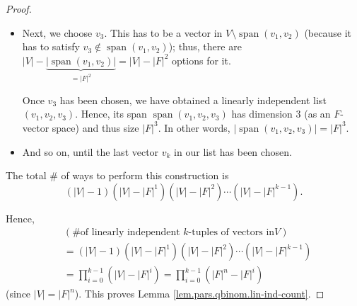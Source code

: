 \begin{proof}
\begin{itemize}
Once $v_{2}$ has been chosen, we have obtained a linearly independent list
$\left(  v_{1},v_{2}\right)  $. Hence, its span $\operatorname*{span}\left(
v_{1},v_{2}\right)  $ has dimension $2$ (as an $F$-vector space) and thus size
$\left\vert F\right\vert ^{2}$. In other words, $\left\vert
\operatorname*{span}\left(  v_{1},v_{2}\right)  \right\vert =\left\vert
F\right\vert ^{2}$.

\item Next, we choose $v_{3}$. This has to be a vector in $V\setminus
\operatorname*{span}\left(  v_{1},v_{2}\right)  $ (because it has to satisfy
$v_{3}\notin\operatorname*{span}\left(  v_{1},v_{2}\right)  $); thus, there
are $\left\vert V\right\vert -\underbrace{\left\vert \operatorname*{span}%
\left(  v_{1},v_{2}\right)  \right\vert }_{=\left\vert F\right\vert ^{2}%
}=\left\vert V\right\vert -\left\vert F\right\vert ^{2}$ options for it.

Once $v_{3}$ has been chosen, we have obtained a linearly independent list
$\left(  v_{1},v_{2},v_{3}\right)  $. Hence, its span $\operatorname*{span}%
\left(  v_{1},v_{2},v_{3}\right)  $ has dimension $3$ (as an $F$-vector space)
and thus size $\left\vert F\right\vert ^{3}$. In other words, $\left\vert
\operatorname*{span}\left(  v_{1},v_{2},v_{3}\right)  \right\vert =\left\vert
F\right\vert ^{3}$.

\item And so on, until the last vector $v_{k}$ in our list has been chosen.
\end{itemize}

The total \# of ways to perform this construction is%
\[
\left(  \left\vert V\right\vert -1\right)  \left(  \left\vert V\right\vert
-\left\vert F\right\vert ^{1}\right)  \left(  \left\vert V\right\vert
-\left\vert F\right\vert ^{2}\right)  \cdots\left(  \left\vert V\right\vert
-\left\vert F\right\vert ^{k-1}\right)  .
\]


Hence,
\begin{align*}
&  \left(  \text{\# of linearly independent }k\text{-tuples of vectors in
}V\right) \\
&  =\left(  \left\vert V\right\vert -1\right)  \left(  \left\vert V\right\vert
-\left\vert F\right\vert ^{1}\right)  \left(  \left\vert V\right\vert
-\left\vert F\right\vert ^{2}\right)  \cdots\left(  \left\vert V\right\vert
-\left\vert F\right\vert ^{k-1}\right) \\
&  =\prod_{i=0}^{k-1}\left(  \left\vert V\right\vert -\left\vert F\right\vert
^{i}\right)  =\prod_{i=0}^{k-1}\left(  \left\vert F\right\vert ^{n}-\left\vert
F\right\vert ^{i}\right)
\end{align*}
(since $\left\vert V\right\vert =\left\vert F\right\vert ^{n}$). This proves
Lemma \ref{lem.pars.qbinom.lin-ind-count}.
\end{proof}


